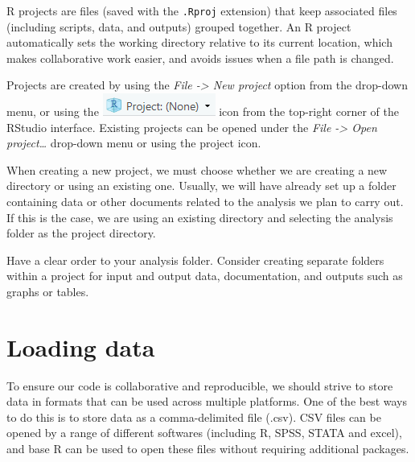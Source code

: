 \documentclass[
  letterpaper,
  DIV=11,
  numbers=noendperiod]{scrreprt}
\begin{document}
R projects are files (saved with the \texttt{.Rproj} extension) that
keep associated files (including scripts, data, and outputs) grouped
together. An R project automatically sets the working directory relative
to its current location, which makes collaborative work easier, and
avoids issues when a file path is changed.

Projects are created by using the \emph{File -\textgreater{} New
project} option from the drop-down menu, or using the
\includegraphics{img/project_icon.png} icon from the top-right corner of
the RStudio interface. Existing projects can be opened under the
\emph{File -\textgreater{} Open project\ldots{}} drop-down menu or using
the project icon.

When creating a new project, we must choose whether we are creating a
new directory or using an existing one. Usually, we will have already
set up a folder containing data or other documents related to the
analysis we plan to carry out. If this is the case, we are using an
existing directory and selecting the analysis folder as the project
directory.

\begin{tcolorbox}[enhanced jigsaw, bottomrule=.15mm, left=2mm, leftrule=.75mm, bottomtitle=1mm, coltitle=black, colbacktitle=quarto-callout-tip-color!10!white, toptitle=1mm, arc=.35mm, breakable, title=\textcolor{quarto-callout-tip-color}{\faLightbulb}\hspace{0.5em}{Style tip}, rightrule=.15mm, toprule=.15mm, opacityback=0, opacitybacktitle=0.6, titlerule=0mm, colback=white, colframe=quarto-callout-tip-color-frame]

Have a clear order to your analysis folder. Consider creating separate
folders within a project for input and output data, documentation, and
outputs such as graphs or tables.

\end{tcolorbox}

\section{Loading data}\label{loading-data}

To ensure our code is collaborative and reproducible, we should strive
to store data in formats that can be used across multiple platforms. One
of the best ways to do this is to store data as a comma-delimited file
(.csv). CSV files can be opened by a range of different softwares
(including R, SPSS, STATA and excel), and base R can be used to open
these files without requiring additional packages.
\end{document}
